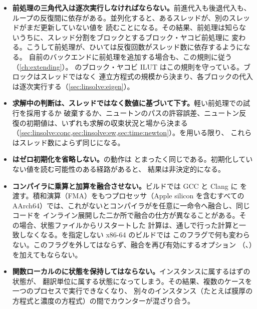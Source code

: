 \begin{itemize}
  \item \textbf{前処理の三角代入は逐次実行しなければならない。}前進代入も後退代入も、
    ループの反復間に依存がある。並列化すると、あるスレッドが、別のスレッドがまだ更新していない値を
    読むことになる。その結果、前処理は知らないうちに、スレッド分割をブロックとするブロック・ヤコビ前処理に
    変わる。こうして前処理が、ひいては反復回数がスレッド数に依存するようになる。
    自前のバックエンドに前処理を追加する場合も、この規則に従う（\cref{ch:extending}）。
    のブロック・ヤコビ ILUT はこの規則を守っている。ブロックはスレッドではなく
    連立方程式の規模から決まり、各ブロックの代入は逐次実行する（\cref{sec:linsolve:eigen}）。
  \item \textbf{求解中の判断は、スレッドではなく数値に基づいて下す。}軽い前処理での試行を採用するか
    破棄するか、ニュートンのパスの許容誤差、ニュートン反復の初期値は、いずれも求解の収束状況と場から決まる
    （\cref{sec:linsolve:conc,sec:linsolve:ew,sec:time:newton}）。を用いる限り、
    これらはスレッド数によらず同じになる。
  \item \textbf{はゼロ初期化を省略しない。}の動作は
    とまったく同じである。初期化していない値を読む可能性のある経路があると、
    結果は非決定的になる。
  \item \textbf{コンパイラに乗算と加算を融合させない。}ビルドでは GCC と Clang に
    を渡す。積和演算（FMA）をもつプロセッサ（Apple silicon を含むすべての
    AArch64）では、これがないとコンパイラがを任意に一命令へ融合し、同じコードを
    インライン展開した二か所で融合の仕方が異なることがある。その場合、状態ファイルからリスタートした
    計算は、通しで行った計算と一致しなくなる。を指定しない x86-64 のビルドでは
    このフラグで何も変わらない。このフラグを外してはならず、融合を再び有効にするオプション
    （、）を加えてもならない。
  \item \textbf{関数ローカルのに状態を保持してはならない。}インスタンスに属するはずの状態が、
    翻訳単位に属する状態になってしまう。その結果、複数のケースを一つのプロセスで実行できなくなり、
    別々のインスタンス（たとえば膜厚の方程式と濃度の方程式）の間でカウンターが混ざり合う。
\end{itemize}
